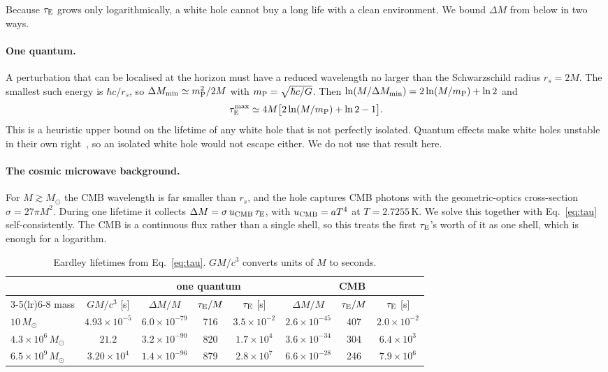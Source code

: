 \documentclass[11pt,a4paper]{article}
\newcommand{\dM}{\Delta M}
\newcommand{\tauE}{\tau_{\rm E}}
\newcommand{\Msun}{M_\odot}
\begin{document}
Because $\tauE$ grows only logarithmically, a white hole cannot buy a long life with a clean environment. We bound $\dM$ from below in two ways.

\paragraph{One quantum.} A perturbation that can be localised at the horizon must have a reduced wavelength no larger than the Schwarzschild radius $r_s=2M$. The smallest such energy is $\hbar c/r_s$, so $\dM_{\min} \simeq m_{\rm P}^2/2M$ with $m_{\rm P}=\sqrt{\hbar c/G}$. Then $\ln(M/\dM_{\min}) = 2\ln(M/m_{\rm P})+\ln 2$ and
\begin{equation}
\tauE^{\max} \simeq 4M\big[2\ln(M/m_{\rm P}) + \ln 2 - 1\big].
\end{equation}
This is a heuristic upper bound on the lifetime of any white hole that is not perfectly isolated. Quantum effects make white holes unstable in their own right~\cite{ZNS1974}, so an isolated white hole would not escape either. We do not use that result here.

\paragraph{The cosmic microwave background.} For $M \gtrsim \Msun$ the CMB wavelength is far smaller than $r_s$, and the hole captures CMB photons with the geometric-optics cross-section $\sigma = 27\pi M^2$. During one lifetime it collects $\dM = \sigma\,u_{\rm CMB}\,\tauE$, with $u_{\rm CMB}=aT^4$ at $T=2.7255$\,K. We solve this together with Eq.~\eqref{eq:tau} self-consistently. The CMB is a continuous flux rather than a single shell, so this treats the first $\tauE$'s worth of it as one shell, which is enough for a logarithm.

\begin{table}[t]
\centering
\caption{Eardley lifetimes from Eq.~\eqref{eq:tau}. $GM/c^3$ converts units of $M$ to seconds.}
\label{tab:life}
\small
\begin{tabular}{lccccccc}
\toprule
 & & \multicolumn{3}{c}{one quantum} & \multicolumn{3}{c}{CMB}\\
\cmidrule(lr){3-5}\cmidrule(lr){6-8}
mass & $GM/c^3$ [s] & $\dM/M$ & $\tauE/M$ & $\tauE$ [s] & $\dM/M$ & $\tauE/M$ & $\tauE$ [s]\\
\midrule
$10\,\Msun$ & $4.93\times10^{-5}$ & $6.0\times10^{-79}$ & 716 & $3.5\times10^{-2}$ & $2.6\times10^{-45}$ & 407 & $2.0\times10^{-2}$\\
$4.3\times10^{6}\,\Msun$ & $21.2$ & $3.2\times10^{-90}$ & 820 & $1.7\times10^{4}$ & $3.6\times10^{-34}$ & 304 & $6.4\times10^{3}$\\
$6.5\times10^{9}\,\Msun$ & $3.20\times10^{4}$ & $1.4\times10^{-96}$ & 879 & $2.8\times10^{7}$ & $6.6\times10^{-28}$ & 246 & $7.9\times10^{6}$\\
\bottomrule
\end{tabular}
\end{table}
\end{document}
